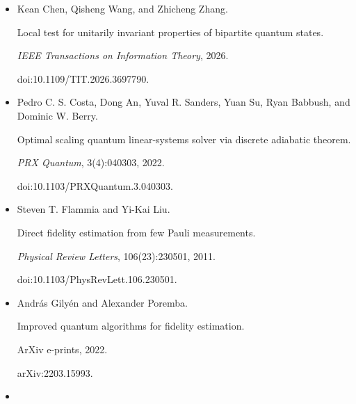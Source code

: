 \begin{itemize}
Anthony Chefles.


Quantum state discrimination.


\emph{Contemporary Physics}, 41(6):401–424, 2000.


doi:10.1080/00107510010002599.





\item[] 
[11]

Kean Chen, Qisheng Wang, and Zhicheng Zhang.


Local test for unitarily invariant properties of bipartite quantum
states.


\emph{IEEE Transactions on Information Theory}, 2026.


doi:10.1109/TIT.2026.3697790.





\item[] 
[12]

Pedro C. S. Costa, Dong An, Yuval R. Sanders, Yuan Su, Ryan Babbush, and
Dominic W. Berry.


Optimal scaling quantum linear-systems solver via discrete adiabatic
theorem.


\emph{PRX Quantum}, 3(4):040303, 2022.


doi:10.1103/PRXQuantum.3.040303.





\item[] 
[13]

Steven T. Flammia and Yi-Kai Liu.


Direct fidelity estimation from few Pauli measurements.


\emph{Physical Review Letters}, 106(23):230501, 2011.


doi:10.1103/PhysRevLett.106.230501.





\item[] 
[14]

András Gilyén and Alexander Poremba.


Improved quantum algorithms for fidelity estimation.


ArXiv e-prints, 2022.


arXiv:2203.15993.





\item[] 
[15]


\end{itemize}
